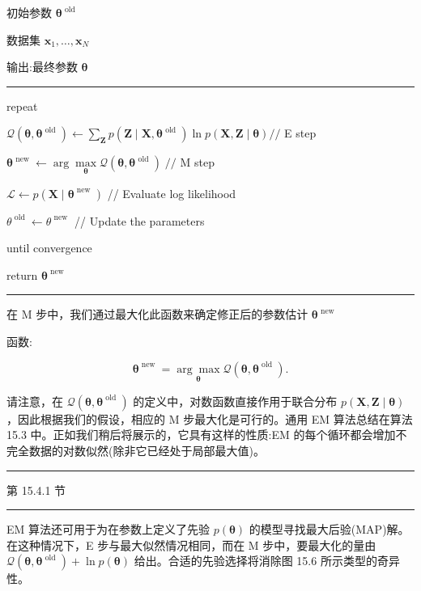 \documentclass[10pt]{report}
\newcommand{\HRule}{\begin{center}\rule{0.9\linewidth}{0.2mm}\end{center}}
\begin{document}
初始参数 \({\mathbf{\theta }}^{\text{ old }}\)

数据集 \({\mathbf{x}}_{1},\ldots ,{\mathbf{x}}_{N}\)

输出:最终参数 \(\mathbf{\theta }\)

\HRule

repeat

\hspace*{1em} \(\mathcal{Q}\left( {\mathbf{\theta },{\mathbf{\theta }}^{\text{ old }}}\right)  \leftarrow  \mathop{\sum }\limits_{\mathbf{Z}}p\left( {\mathbf{Z} \mid  \mathbf{X},{\mathbf{\theta }}^{\text{ old }}}\right) \ln p\left( {\mathbf{X},\mathbf{Z} \mid  \mathbf{\theta }}\right) //\) E step

\hspace*{1em} \({\mathbf{\theta }}^{\text{ new }} \leftarrow  \arg \mathop{\max }\limits_{\mathbf{\theta }}\mathcal{Q}\left( {\mathbf{\theta },{\mathbf{\theta }}^{\text{ old }}}\right) \;//\) M step

\hspace*{1em} \(\mathcal{L} \leftarrow  p\left( {\mathbf{X} \mid  {\mathbf{\theta }}^{\text{ new }}}\right)\) // Evaluate log likelihood

\hspace*{1em} \({\theta }^{\text{ old }} \leftarrow  {\theta }^{\text{ new }}\) // Update the parameters

until convergence

return \({\mathbf{\theta }}^{\text{ new }}\)

\HRule

在 M 步中，我们通过最大化此函数来确定修正后的参数估计 \({\mathbf{\theta }}^{\text{ new }}\)

函数:

\[
{\mathbf{\theta }}^{\text{ new }} = \underset{\mathbf{\theta }}{\arg \max }\mathcal{Q}\left( {\mathbf{\theta },{\mathbf{\theta }}^{\text{ old }}}\right) . \tag{15.24}
\]

请注意，在 \(\mathcal{Q}\left( {\mathbf{\theta },{\mathbf{\theta }}^{\text{ old }}}\right)\) 的定义中，对数函数直接作用于联合分布 \(p\left( {\mathbf{X},\mathbf{Z} \mid  \mathbf{\theta }}\right)\) ，因此根据我们的假设，相应的 M 步最大化是可行的。通用 EM 算法总结在算法 15.3 中。正如我们稍后将展示的，它具有这样的性质:EM 的每个循环都会增加不完全数据的对数似然(除非它已经处于局部最大值)。

\HRule

第 15.4.1 节

\HRule

EM 算法还可用于为在参数上定义了先验 \(p\left( \mathbf{\theta }\right)\) 的模型寻找最大后验(MAP)解。在这种情况下，E 步与最大似然情况相同，而在 \(\mathrm{M}\) 步中，要最大化的量由 \(\mathcal{Q}\left( {\mathbf{\theta },{\mathbf{\theta }}^{\text{ old }}}\right)  + \ln p\left( \mathbf{\theta }\right)\) 给出。合适的先验选择将消除图 15.6 所示类型的奇异性。
\end{document}
